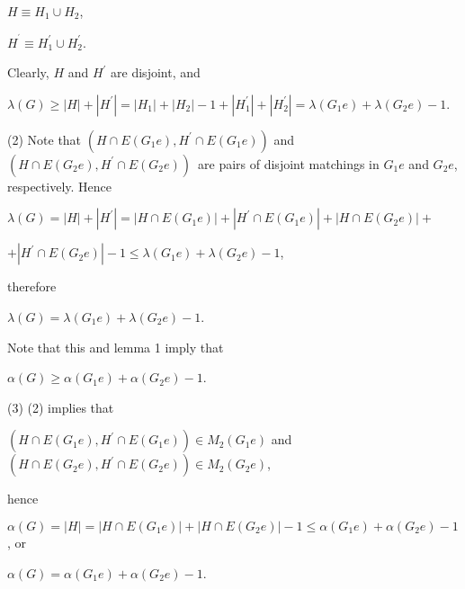 \documentclass{article}
\begin{document}
\begin{center}
$H\equiv H_{1}\cup H_{2}$,

$H^{^{\prime }}\equiv H_{1}^{\prime }\cup H_{2}^{\prime }$.
\end{center}

Clearly, $H$ and $H^{\prime }$ are disjoint, and

\begin{center}
$\lambda (G)\geq \left\vert H\right\vert +\left\vert H^{\prime }\right\vert
=\left\vert H_{1}\right\vert +\left\vert H_{2}\right\vert -1+\left\vert
H_{1}^{\prime }\right\vert +\left\vert H_{2}^{\prime }\right\vert =\lambda
(G_{1}e)+\lambda (G_{2}e)-1$.
\end{center}

(2) Note that $(H\cap E(G_{1}e),H^{\prime }\cap E(G_{1}e))$ and $(H\cap
E(G_{2}e),H^{\prime }\cap E(G_{2}e))$\ are pairs of disjoint matchings in $G_{1}e$ and $G_{2}e$, respectively. Hence

\begin{center}
$\lambda (G)=\left\vert H\right\vert +\left\vert H^{\prime }\right\vert
=\left\vert H\cap E(G_{1}e)\right\vert +\left\vert H^{\prime }\cap
E(G_{1}e)\right\vert +\left\vert H\cap E(G_{2}e)\right\vert +$

$+\left\vert H^{\prime }\cap E(G_{2}e)\right\vert -1\leq \lambda
(G_{1}e)+\lambda (G_{2}e)-1$,
\end{center}

therefore

\begin{center}
$\lambda (G)=\lambda (G_{1}e)+\lambda (G_{2}e)-1$.
\end{center}

Note that this and lemma 1 imply that

\begin{center}
$\alpha (G)\geq \alpha (G_{1}e)+\alpha (G_{2}e)-1$.
\end{center}

(3) (2) implies that

\begin{center}
$(H\cap E(G_{1}e),H^{\prime }\cap E(G_{1}e))\in M_{2}(G_{1}e)$ and $(H\cap
E(G_{2}e),H^{\prime }\cap E(G_{2}e))\in M_{2}(G_{2}e)$,
\end{center}

hence

\begin{center}
$\alpha (G)=\left\vert H\right\vert =\left\vert H\cap E(G_{1}e)\right\vert
+\left\vert H\cap E(G_{2}e)\right\vert -1\leq \alpha (G_{1}e)+\alpha
(G_{2}e)-1$, or

$\alpha (G)=\alpha (G_{1}e)+\alpha (G_{2}e)-1$.
\end{center}
\end{document}
